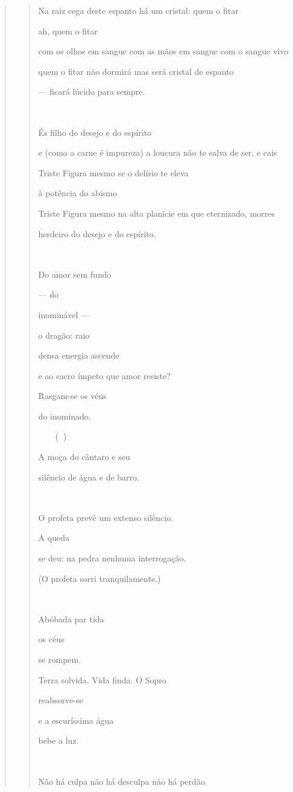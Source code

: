 \begin{verse}
\begin{quote}
Na raiz cega deste espanto há um cristal: quem o fitar

ah, quem o fitar

com os olhos em sangue com as mãos em sangue com o sangue vivo

quem o fitar não dormirá mas será cristal de espanto

--- ficará lúcido para sempre.

 

És filho do desejo e do espírito

e (como a carne é impureza) a loucura não te salva de ser, e cais

Triste Figura mesmo se o delírio te eleva

à potência do abismo

Triste Figura mesmo na alta planície em que eternizado, morres

herdeiro do desejo e do espírito.



Do amor sem fundo

--- do

inominável ---

o dragão: raio

densa energia ascende

e ao sacro ímpeto que amor resiste?

Rasgam-se os véus

do inominado.

 ()

A moça do cântaro e seu

silêncio de água e de barro.

 

O profeta prevê um extenso silêncio.

A queda

se deu: na pedra nenhuma interrogação.

(O profeta sorri tranquilamente.)



Abóbada par tida

os céus

se rompem.

Terra solvida. Vida finda. O Sopro

reabsorve-se

e a escuríssima água

bebe a luz.



Não há culpa não há desculpa não há perdão.


\end{quote}
\end{verse}
